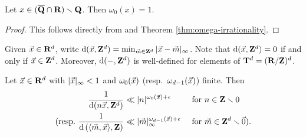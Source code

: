 \begin{theorem}[Roth]
Let $x\in (\overline{\mathbf{Q}}\cap \mathbf{R})\smallsetminus \mathbf{Q}$. Then 
$\omega_0(x) = 1$. 
\end{theorem}
\begin{proof}
This follows directly from \cite{roth-1955} and Theorem 
\ref{thm:omega-irrationality}.
\end{proof}

Given $\vec{x}\in \mathbf{R}^d$, write 
$\mathrm{d}(\vec{x},\mathbf{Z}^d)=\min_{\vec{m}\in \mathbf{Z}^d} |\vec{x}-\vec{m}|_\infty$. Note that 
$\mathrm{d}(\vec{x},\mathbf{Z}^d)=0$ if and only if $\vec{x}\in \mathbf{Z}^d$. Moreover, $\mathrm{d}(-,\mathbf{Z}^d)$ 
is well-defined for elements of $\mathbf{T}^d = (\mathbf{R}/\mathbf{Z})^d$. 

\begin{lemma}\label{lem:bound-distance}
Let $\vec{x}\in \mathbf{R}^d$ with $|\vec{x}|_\infty< 1$ and $\omega_0(\vec{x})$ 
(resp.~$\omega_{d-1}(\vec{x})$) finite. Then 
\begin{align*}
	\frac{1}{\mathrm{d}(n \vec{x},\mathbf{Z}^d)} 
		&\ll |n|^{\omega_0(\vec{x})+\epsilon} 
		&&\text{ for $n\in \mathbf{Z}\smallsetminus 0$} \\
	\text{(resp.~}
	\frac{1}{\mathrm{d}\left(\langle \vec{m},\vec{x}\rangle, \mathbf{Z}\right)} 
		&\ll |\vec{m}|_\infty^{\omega_{d-1}(\vec{x})+\epsilon} 
		&&\text{ for $\vec{m}\in \mathbf{Z}^d\smallsetminus \vec{0}$).}
\end{align*}
\end{lemma}
